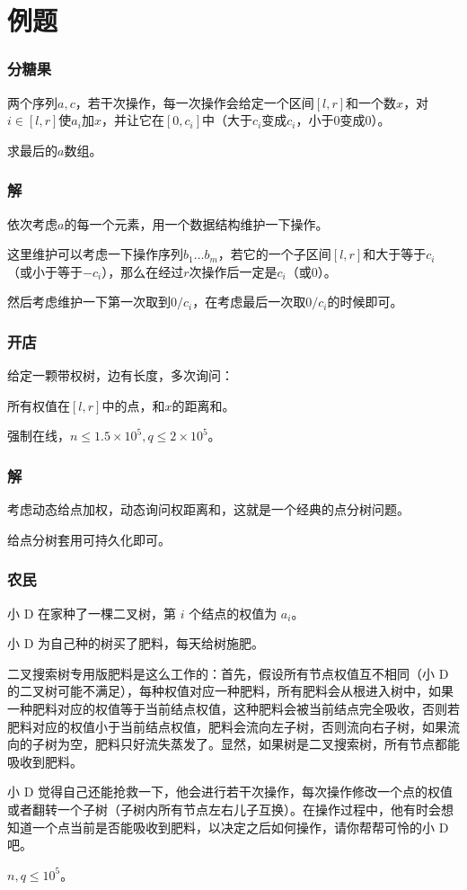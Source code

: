 \documentclass[10pt]{beamer}
\begin{document}
	\section{例题}
	\begin{frame}
		\frametitle{分糖果}
	
		两个序列$a,c$，若干次操作，每一次操作会给定一个区间$[l,r]$和一个数$x$，对$i\in[l,r]$使$a_i$加$x$，并让它在$[0,c_i]$中（大于$c_i$变成$c_i$，小于$0$变成$0$）。

		求最后的$a$数组。
	
	\end{frame}
	\begin{frame}
		\frametitle{解}
	
		依次考虑$a$的每一个元素，用一个数据结构维护一下操作。

		这里维护可以考虑一下操作序列$b_1\dots b_m$，若它的一个子区间$[l,r]$和大于等于$c_i$（或小于等于$-c_i$），那么在经过$r$次操作后一定是$c_i$（或$0$）。

		然后考虑维护一下第一次取到$0/c_i$，在考虑最后一次取$0/c_i$的时候即可。
	
	\end{frame}
	\begin{frame}
		\frametitle{开店}
	
		给定一颗带权树，边有长度，多次询问：

		所有权值在$[l,r]$中的点，和$x$的距离和。

		强制在线，$n\le 1.5\times 10^5,q\le 2\times 10^5$。
	
	\end{frame}
	\begin{frame}
		\frametitle{解}
	
		考虑动态给点加权，动态询问权距离和，这就是一个经典的点分树问题。

		给点分树套用可持久化即可。
	
	\end{frame}
	\begin{frame}
		\frametitle{农民}
	
		小 D 在家种了一棵二叉树，第 $i$ 个结点的权值为 $a_i$。

		小 D 为自己种的树买了肥料，每天给树施肥。

		二叉搜索树专用版肥料是这么工作的：首先，假设所有节点权值互不相同（小 D 的二叉树可能不满足），每种权值对应一种肥料，所有肥料会从根进入树中，如果一种肥料对应的权值等于当前结点权值，这种肥料会被当前结点完全吸收，否则若肥料对应的权值小于当前结点权值，肥料会流向左子树，否则流向右子树，如果流向的子树为空，肥料只好流失蒸发了。显然，如果树是二叉搜索树，所有节点都能吸收到肥料。

		小 D 觉得自己还能抢救一下，他会进行若干次操作，每次操作修改一个点的权值或者翻转一个子树（子树内所有节点左右儿子互换）。在操作过程中，他有时会想知道一个点当前是否能吸收到肥料，以决定之后如何操作，请你帮帮可怜的小 D 吧。
	
		$n,q\le 10^5$。
	\end{frame}
\end{document}
